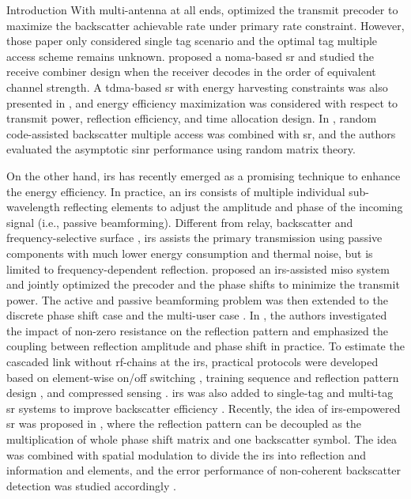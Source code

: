 \documentclass[journal]{IEEEtran}
\begin{document}
\begin{section}{Introduction}
	With multi-antenna at all ends, \cite{Wu2021a} optimized the transmit precoder to maximize the backscatter achievable rate under primary rate constraint.
	However, those paper only considered single tag scenario and the optimal tag multiple access scheme remains unknown.
	\cite{Xu2021a} proposed a \gls{noma}-based \gls{sr} and studied the receive combiner design when the receiver decodes in the order of equivalent channel strength.
	A \gls{tdma}-based \gls{sr} with energy harvesting constraints was also presented in \cite{Yang2021a}, and energy efficiency maximization was considered with respect to transmit power, reflection efficiency, and time allocation design.
	In \cite{Han2021}, random code-assisted backscatter multiple access was combined with \gls{sr}, and the authors evaluated the asymptotic \gls{sinr} performance using random matrix theory.

	On the other hand, \gls{irs} has recently emerged as a promising technique to enhance the energy efficiency.
	In practice, an \gls{irs} consists of multiple individual sub-wavelength reflecting elements to adjust the amplitude and phase of the incoming signal (i.e., passive beamforming).
	Different from relay, backscatter and frequency-selective surface \cite{Anwar2018}, \gls{irs} assists the primary transmission using passive components with much lower energy consumption and thermal noise, but is limited to frequency-dependent reflection.
	\cite{Wu2018} proposed an \gls{irs}-assisted \gls{miso} system and jointly optimized the precoder and the phase shifts to minimize the transmit power.
	The active and passive beamforming problem was then extended to the discrete phase shift case \cite{Wu2019a} and the multi-user case \cite{Wu2019}.
	In \cite{Abeywickrama2020}, the authors investigated the impact of non-zero resistance on the reflection pattern and emphasized the coupling between reflection amplitude and phase shift in practice.
	To estimate the cascaded link without \gls{rf}-chains at the \gls{irs}, practical protocols were developed based on element-wise on/off switching \cite{Nadeem2019}, training sequence and reflection pattern design \cite{You2019,Kang2020}, and compressed sensing \cite{Wang2020}.
	\gls{irs} was also added to single-tag and multi-tag \gls{sr} systems to improve backscatter efficiency \cite{Chen2021,Zhang2021d}.
	Recently, the idea of \gls{irs}-empowered \gls{sr} was proposed in \cite{Xu2020b,Hua2022}, where the reflection pattern can be decoupled as the multiplication of whole phase shift matrix and one backscatter symbol.
	The idea was combined with spatial modulation to divide the \gls{irs} into reflection and information and elements, and the error performance of non-coherent backscatter detection was studied accordingly \cite{Hu2021a}.


\end{section}
\end{document}
